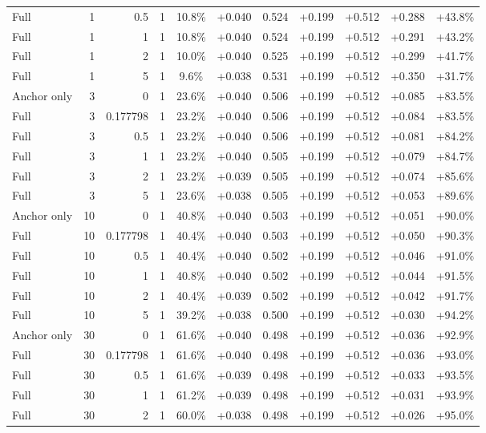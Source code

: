 \begin{table}[htbp]
\begin{tabular}{lrrrccccccc}
Full & 1 & 0.5 & 1 & 10.8\% & +0.040 & 0.524 & +0.199 & +0.512 & +0.288 & +43.8\% \\
Full & 1 & 1 & 1 & 10.8\% & +0.040 & 0.524 & +0.199 & +0.512 & +0.291 & +43.2\% \\
Full & 1 & 2 & 1 & 10.0\% & +0.040 & 0.525 & +0.199 & +0.512 & +0.299 & +41.7\% \\
Full & 1 & 5 & 1 & 9.6\% & +0.038 & 0.531 & +0.199 & +0.512 & +0.350 & +31.7\% \\
Anchor only & 3 & 0 & 1 & 23.6\% & +0.040 & 0.506 & +0.199 & +0.512 & +0.085 & +83.5\% \\
Full & 3 & 0.177798 & 1 & 23.2\% & +0.040 & 0.506 & +0.199 & +0.512 & +0.084 & +83.5\% \\
Full & 3 & 0.5 & 1 & 23.2\% & +0.040 & 0.506 & +0.199 & +0.512 & +0.081 & +84.2\% \\
Full & 3 & 1 & 1 & 23.2\% & +0.040 & 0.505 & +0.199 & +0.512 & +0.079 & +84.7\% \\
Full & 3 & 2 & 1 & 23.2\% & +0.039 & 0.505 & +0.199 & +0.512 & +0.074 & +85.6\% \\
Full & 3 & 5 & 1 & 23.6\% & +0.038 & 0.505 & +0.199 & +0.512 & +0.053 & +89.6\% \\
Anchor only & 10 & 0 & 1 & 40.8\% & +0.040 & 0.503 & +0.199 & +0.512 & +0.051 & +90.0\% \\
Full & 10 & 0.177798 & 1 & 40.4\% & +0.040 & 0.503 & +0.199 & +0.512 & +0.050 & +90.3\% \\
Full & 10 & 0.5 & 1 & 40.4\% & +0.040 & 0.502 & +0.199 & +0.512 & +0.046 & +91.0\% \\
Full & 10 & 1 & 1 & 40.8\% & +0.040 & 0.502 & +0.199 & +0.512 & +0.044 & +91.5\% \\
Full & 10 & 2 & 1 & 40.4\% & +0.039 & 0.502 & +0.199 & +0.512 & +0.042 & +91.7\% \\
Full & 10 & 5 & 1 & 39.2\% & +0.038 & 0.500 & +0.199 & +0.512 & +0.030 & +94.2\% \\
Anchor only & 30 & 0 & 1 & 61.6\% & +0.040 & 0.498 & +0.199 & +0.512 & +0.036 & +92.9\% \\
Full & 30 & 0.177798 & 1 & 61.6\% & +0.040 & 0.498 & +0.199 & +0.512 & +0.036 & +93.0\% \\
Full & 30 & 0.5 & 1 & 61.6\% & +0.039 & 0.498 & +0.199 & +0.512 & +0.033 & +93.5\% \\
Full & 30 & 1 & 1 & 61.2\% & +0.039 & 0.498 & +0.199 & +0.512 & +0.031 & +93.9\% \\
Full & 30 & 2 & 1 & 60.0\% & +0.038 & 0.498 & +0.199 & +0.512 & +0.026 & +95.0\% \\

\end{tabular}
\end{table}
